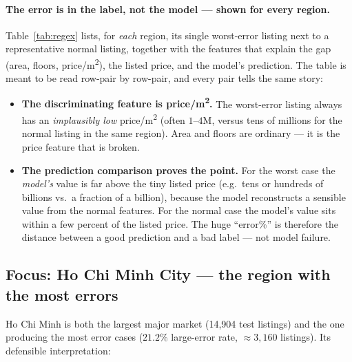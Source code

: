 \documentclass[11pt]{article}
\newcommand{\pct}{\%}
\begin{document}
\paragraph{The error is in the label, not the model --- shown for every region.}
Table~\ref{tab:regex} lists, for \emph{each} region, its single worst-error listing next to a
representative normal listing, together with the features that explain the gap (area, floors,
price/m\textsuperscript{2}), the listed price, and the model's prediction. The table is meant to be
read row-pair by row-pair, and every pair tells the same story:

\begin{itemize}
  \item \textbf{The discriminating feature is price/m\textsuperscript{2}.} The worst-error listing
        always has an \emph{implausibly low} price/m\textsuperscript{2} (often $1$--$4$M, versus tens
        of millions for the normal listing in the same region). Area and floors are ordinary --- it is
        the price feature that is broken.
  \item \textbf{The prediction comparison proves the point.} For the worst case the \emph{model's}
        value is far above the tiny listed price (e.g.\ tens or hundreds of billions vs.\ a fraction
        of a billion), because the model reconstructs a sensible value from the normal features. For
        the normal case the model's value sits within a few percent of the listed price. The huge
        ``error\%'' is therefore the distance between a good prediction and a bad label --- not model
        failure.
\end{itemize}



\subsection*{Focus: Ho Chi Minh City --- the region with the most errors}
Ho Chi Minh is both the largest major market (14,904 test listings) and the one producing the most
error cases ($21.2\pct$ large-error rate, $\approx 3{,}160$ listings). Its defensible interpretation:
\end{document}
